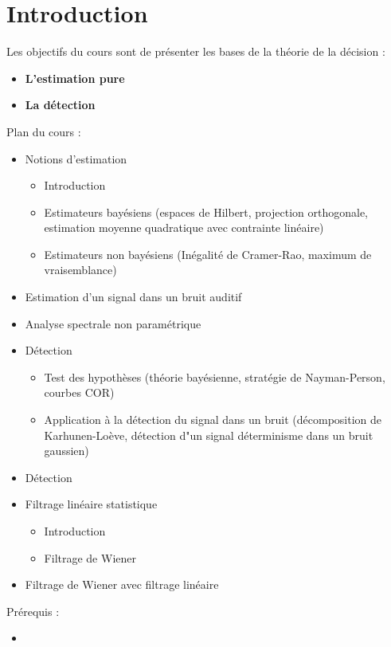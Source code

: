\chapter*{Introduction}
Les objectifs du cours sont de présenter les bases de la théorie de la décision :
\begin{itemize}
    \item \textbf{L'estimation pure}
    \item \textbf{La détection} \newline
\end{itemize}

Plan du cours :
\begin{itemize}
    \item Notions d'estimation
    \begin{itemize}
        \item Introduction
        \item Estimateurs bayésiens (espaces de Hilbert, projection orthogonale, estimation moyenne quadratique  avec contrainte linéaire)
        \item Estimateurs non bayésiens (Inégalité de Cramer-Rao, maximum de vraisemblance)
    \end{itemize}
    \item Estimation d'un signal dans un bruit auditif
    \item Analyse spectrale non paramétrique
    \item Détection
    \begin{itemize}
        \item Test des hypothèses (théorie bayésienne, stratégie de Nayman-Person, courbes COR)
        \item Application à la détection du signal dans un bruit (décomposition de Karhunen-Loève, détection d"un signal déterminisme dans un bruit gaussien)
    \end{itemize}
    \item Détection
    \item Filtrage linéaire statistique
    \begin{itemize}
        \item Introduction
        \item Filtrage de Wiener 
    \end{itemize}
    \item Filtrage de Wiener avec filtrage linéaire
\end{itemize}
Prérequis :
\begin{itemize}
    \item 
\end{itemize}